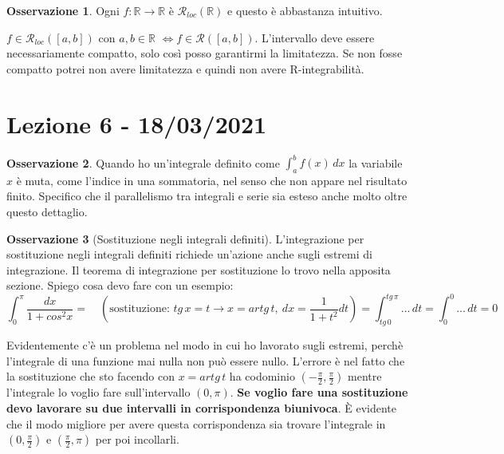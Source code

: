 \documentclass{article}
\theoremstyle{definition}
\theoremstyle{definition}
\theoremstyle{definition}
\theoremstyle{definition}
\newtheorem{remark}{Osservazione}[section]
\theoremstyle{definition}
\begin{document}
\begin{remark}
    Ogni $f:\mathbb{R}\rightarrow\mathbb{R}$ è $\mathcal{R}_{loc}(\mathbb{R})$ e questo è abbastanza intuitivo.

    $f\in\mathcal{R}_{loc}([a,b])$ con $a,b\in\mathbb{R}$ $\Leftrightarrow f\in\mathcal{R}([a,b])$. L'intervallo deve essere necessariamente compatto, solo così posso garantirmi la limitatezza. Se non fosse compatto potrei non avere limitatezza e quindi non avere R-integrabilità.
\end{remark}

\newpage
\section{Lezione 6 - 18/03/2021}

\begin{remark}
    Quando ho un'integrale definito come $\displaystyle{\int_a^b f(x)\,dx}$ la variabile $x$ è muta, come l'indice in una sommatoria, nel senso che non appare nel risultato finito. Specifico che il parallelismo tra integrali e serie sia esteso anche molto oltre questo dettaglio.
\end{remark}

\begin{remark}[Sostituzione negli integrali definiti]
    L'integrazione per sostituzione negli integrali definiti richiede un'azione anche sugli estremi di integrazione. Il teorema di integrazione per sostituzione lo trovo nella apposita sezione. Spiego cosa devo fare con un esempio:
    \[\int_0^\pi \frac{dx}{1+cos^2x}=\quad (\text{sostituzione: } tg\,x = t \rightarrow x=artg\,t, \:dx=\frac{1}{1+t^2}dt)=\int_{tg\,0}^{tg\,\pi}...\,dt=\int_0^0...\,dt=0\]

    Evidentemente c'è un problema nel modo in cui ho lavorato sugli estremi, perchè l'integrale di una funzione mai nulla non può essere nullo. L'errore è nel fatto che la sostituzione che sto facendo con $x=artg\,t$ ha codominio $(-\frac{\pi}{2}, \frac{\pi}{2})$ mentre l'integrale lo voglio fare sull'intervallo $(0,\pi)$. \textbf{Se voglio fare una sostituzione devo lavorare su due intervalli in corrispondenza biunivoca}. È evidente che il modo migliore per avere questa corrispondenza sia trovare l'integrale in $(0,\frac{\pi}{2})$ e $(\frac{\pi}{2},\pi)$ per poi incollarli.
\end{remark}
\end{document}
